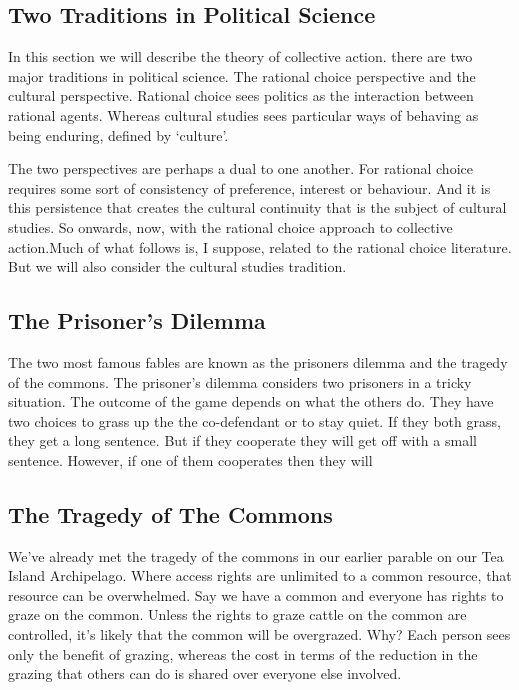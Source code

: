 \documentclass[]{tufte-handout}
\begin{document}
\hypertarget{two-traditions-in-political-science}{%
\subsection{Two Traditions in Political
Science}\label{two-traditions-in-political-science}}

In this section we will describe the theory of collective action. there
are two major traditions in political science. The rational choice
perspective and the cultural perspective. Rational choice sees politics
as the interaction between rational agents. Whereas cultural studies
sees particular ways of behaving as being enduring, defined by
`culture'.

The two perspectives are perhaps a dual to one another. For rational
choice requires some sort of consistency of preference, interest or
behaviour. And it is this persistence that creates the cultural
continuity that is the subject of cultural studies. So onwards, now,
with the rational choice approach to collective action.Much of what
follows is, I suppose, related to the rational choice literature. But we
will also consider the cultural studies tradition.

\hypertarget{the-prisoners-dilemma}{%
\subsection{The Prisoner's Dilemma}\label{the-prisoners-dilemma}}

The two most famous fables are known as the prisoners dilemma and the
tragedy of the commons. The prisoner's dilemma considers two prisoners
in a tricky situation. The outcome of the game depends on what the
others do. They have two choices to grass up the the co-defendant or to
stay quiet. If they both grass, they get a long sentence. But if they
cooperate they will get off with a small sentence. However, if one of
them cooperates then they will

\hypertarget{the-tragedy-of-the-commons}{%
\subsection{The Tragedy of The
Commons}\label{the-tragedy-of-the-commons}}

We've already met the tragedy of the commons in our earlier parable on
our Tea Island Archipelago. Where access rights are unlimited to a
common resource, that resource can be overwhelmed. Say we have a common
and everyone has rights to graze on the common. Unless the rights to
graze cattle on the common are controlled, it's likely that the common
will be overgrazed. Why? Each person sees only the benefit of grazing,
whereas the cost in terms of the reduction in the grazing that others
can do is shared over everyone else involved.
\end{document}
